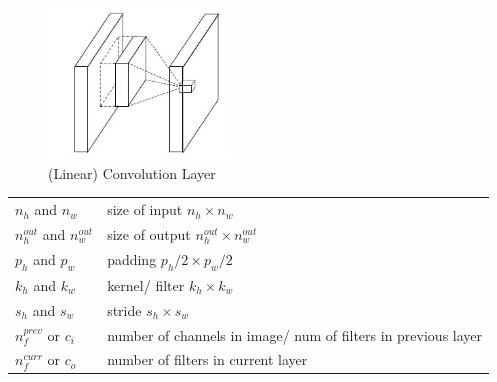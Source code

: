 \begin{table}[h]
    \begin{minipage}{0.44\linewidth}
        \begin{figure}[H]
            \centering
            \includegraphics[width=\linewidth, height=4cm, keepaspectratio]{Pictures/layers/conv-layer-linear.jpg}
            \caption{(Linear) Convolution Layer \cite{medium/towardsdatascience.com/review-nin-network-in-network-image-classification-69e271e499ee}}
        \end{figure}
    \end{minipage}
    \hfill
    \begin{minipage}{0.54\linewidth}
        \begin{customTableWrapper}{1.5}
        \begin{table}[H]
            \begin{tabular}{l p{5.5cm}}
                $n_h$ and $n_w$ & size of input $n_h \times n_w$ \\
                $n^{out}_h$ and $n^{out}_w$ & size of output $n^{out}_h \times n^{out}_w$ \\
                $p_h$ and $p_w$ & padding $p_h/2 \times p_w/2$ \\
                $k_h$ and $k_w$ & kernel/ filter $k_h \times k_w$\\
                $s_h$ and $s_w$ & stride $s_h \times s_w$ \\

                \hline

                $n_f^{prev}$ or $c_i$ & number of channels in image/ num of filters in previous layer \\
                $n_f^{curr}$ or $c_o$ & number of filters in current layer \\
                
            \end{tabular}
        \end{table}
        \end{customTableWrapper}
    \end{minipage}
\end{table}

